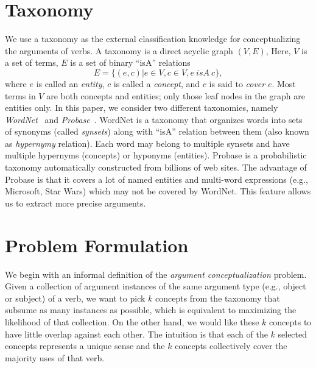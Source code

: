 \section{Taxonomy}
\label{sec:tax}
We use a taxonomy as the external classification knowledge for
conceptualizing the arguments of verbs.
A taxonomy is a direct acyclic graph $(V, E)$,
Here, $V$ is a set of terms, $E$ is a set of binary ``isA'' relations
\[E=\{(e,c)| e\in V, c\in V, e~ isA~ c\},\]
where $e$ is called an {\em entity},
$c$ is called a {\em concept}, and $c$ is said to {\em cover} $e$.
Most terms in $V$ are
both concepts and entities; only those leaf nodes in the graph are
entities only. In this paper, we consider two different taxonomies,
namely {\em WordNet}~\cite{wordnet} and {\em Probase}~\cite{WuLWZ12}.
WordNet is a taxonomy that organizes words into sets of synonyms
(called {\em synsets}) along with ``isA'' relation between them
(also known as {\em hypernymy} relation). Each word may belong to
multiple synsets and have multiple hypernyms (concepts) or hyponyms
(entities).
Probase is a probabilistic taxonomy automatically constructed from
billions of web sites.  The advantage of Probase is that it covers
a lot of named entities and multi-word expressions
(e.g., Microsoft, Star Wars) which may not be covered by WordNet.
This feature allows us to extract more precise arguments.


\section{Problem Formulation}
\label{sec:problem}

We begin with an informal definition of the
{\em argument conceptualization} problem.
Given a collection of argument instances of the same argument
type (e.g., object or subject) of a verb,
we want to pick $k$ concepts from the taxonomy
that subsume as many instances as possible, which
is equivalent to maximizing the likelihood of that collection.
On the other hand, we would like these $k$ concepts to
have little overlap against each other.
The intuition is that each of the $k$ selected concepts represents a unique
sense and the $k$ concepts collectively cover the majority
uses of that verb.

